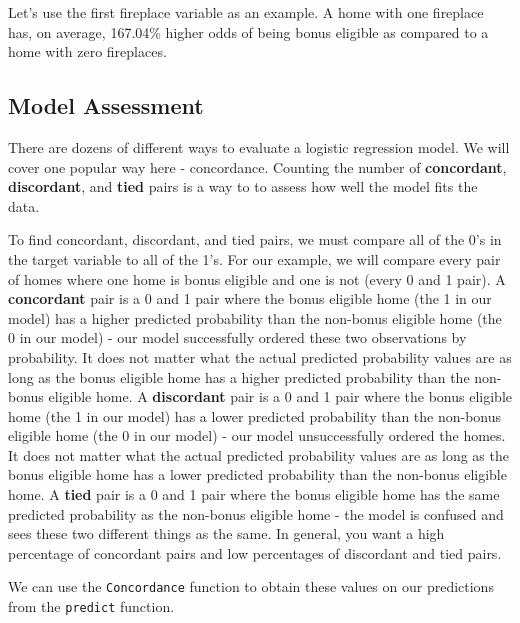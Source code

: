 \documentclass[
  letterpaper,
  DIV=11,
  numbers=noendperiod]{scrreprt}
\newenvironment{Shaded}{\begin{snugshade}}{\end{snugshade}}
\newcommand{\AttributeTok}[1]{\textcolor[rgb]{0.40,0.45,0.13}{#1}}
\newcommand{\FunctionTok}[1]{\textcolor[rgb]{0.28,0.35,0.67}{#1}}
\newcommand{\NormalTok}[1]{\textcolor[rgb]{0.00,0.23,0.31}{#1}}
\newcommand{\SpecialCharTok}[1]{\textcolor[rgb]{0.37,0.37,0.37}{#1}}
\newcommand{\StringTok}[1]{\textcolor[rgb]{0.13,0.47,0.30}{#1}}
\begin{document}
Let's use the first fireplace variable as an example. A home with one
fireplace has, on average, 167.04\% higher odds of being bonus eligible
as compared to a home with zero fireplaces.

\hypertarget{model-assessment}{%
\subsection{Model Assessment}\label{model-assessment}}

There are dozens of different ways to evaluate a logistic regression
model. We will cover one popular way here - concordance. Counting the
number of \textbf{concordant}, \textbf{discordant}, and \textbf{tied}
pairs is a way to to assess how well the model fits the data.

To find concordant, discordant, and tied pairs, we must compare all of
the 0's in the target variable to all of the 1's. For our example, we
will compare every pair of homes where one home is bonus eligible and
one is not (every 0 and 1 pair). A \textbf{concordant} pair is a 0 and 1
pair where the bonus eligible home (the 1 in our model) has a higher
predicted probability than the non-bonus eligible home (the 0 in our
model) - our model successfully ordered these two observations by
probability. It does not matter what the actual predicted probability
values are as long as the bonus eligible home has a higher predicted
probability than the non-bonus eligible home. A \textbf{discordant} pair
is a 0 and 1 pair where the bonus eligible home (the 1 in our model) has
a lower predicted probability than the non-bonus eligible home (the 0 in
our model) - our model unsuccessfully ordered the homes. It does not
matter what the actual predicted probability values are as long as the
bonus eligible home has a lower predicted probability than the non-bonus
eligible home. A \textbf{tied} pair is a 0 and 1 pair where the bonus
eligible home has the same predicted probability as the non-bonus
eligible home - the model is confused and sees these two different
things as the same. In general, you want a high percentage of concordant
pairs and low percentages of discordant and tied pairs.

We can use the \texttt{Concordance} function to obtain these values on
our predictions from the \texttt{predict} function.

\begin{Shaded}
\end{Shaded}
\end{document}
